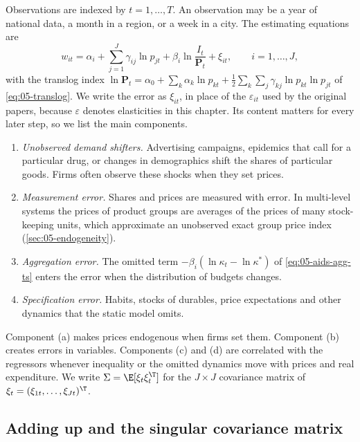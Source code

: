 Observations are indexed by $t = 1, \dots, T$. An observation may be a year of national data, a month in a
region, or a week in a city. The estimating equations are
\begin{equation}\label{eq:05-stoch}
  w_{it} = \alpha_i + \sum_{j=1}^{J}\gamma_{ij}\ln p_{jt} + \beta_i\ln\frac{I_t}{\mathbf{P}_t} + \xi_{it},
  \qquad i = 1, \dots, J,
\end{equation}
with the translog index $\ln\mathbf{P}_t = \alpha_0 + \sum_k\alpha_k\ln p_{kt} + \frac{1}{2}\sum_k\sum_j
\gamma_{kj}\ln p_{kt}\ln p_{jt}$ of \eqref{eq:05-translog}. We write the error as $\xi_{it}$, in place of
the $\varepsilon_{it}$ used by the original papers, because $\varepsilon$ denotes elasticities in this
chapter. Its content matters for every later step, so we list the main components.
\begin{enumerate}[label=(\alph*)]
  \item \emph{Unobserved demand shifters.} Advertising campaigns, epidemics that call for a particular
  drug, or changes in demographics shift the shares of particular goods. Firms often observe these
  shocks when they set prices.
  \item \emph{Measurement error.} Shares and prices are measured with error. In multi-level systems the
  prices of product groups are averages of the prices of many stock-keeping units, which approximate an
  unobserved exact group price index (\cref{sec:05-endogeneity}).
  \item \emph{Aggregation error.} The omitted term $-\beta_i(\ln\kappa_t - \ln\kappa^*)$ of
  \eqref{eq:05-aids-agg-ts} enters the error when the distribution of budgets changes.
  \item \emph{Specification error.} Habits, stocks of durables, price expectations and other dynamics
  that the static model omits.
\end{enumerate}
Component (a) makes prices endogenous when firms set them. Component (b) creates errors in variables.
Components (c) and (d) are correlated with the regressors whenever inequality or the omitted dynamics move
with prices and real expenditure. We write $\Sigma = \E[\xi_t\xi_t^{\T}]$ for the $J\times J$ covariance
matrix of $\xi_t = (\xi_{1t}, \dots, \xi_{Jt})^{\T}$.

\subsection{Adding up and the singular covariance matrix}\label{sec:05-singular}

